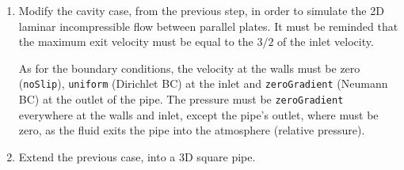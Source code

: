 \documentclass{article}
\begin{document}
\begin{enumerate}
 	\item Modify the cavity case, from the previous step, in order to simulate the 2D laminar incompressible flow between parallel plates. It must be reminded that the maximum exit velocity must be equal to the $3/2$ of the inlet velocity.
 	
 	As for the boundary conditions, the velocity at the walls must be zero ({\tt noSlip}), {\tt uniform} (Dirichlet BC) at the inlet and {\tt zeroGradient} (Neumann BC) at the outlet of the pipe. The pressure must be {\tt zeroGradient} everywhere at the walls and inlet, except the pipe's outlet, where must be zero, as the fluid exits the pipe into the atmosphere (relative pressure).
 	
 	\item Extend the previous case, into a 3D square pipe.
 	
 	
	
\end{enumerate}
	
\end{document}

